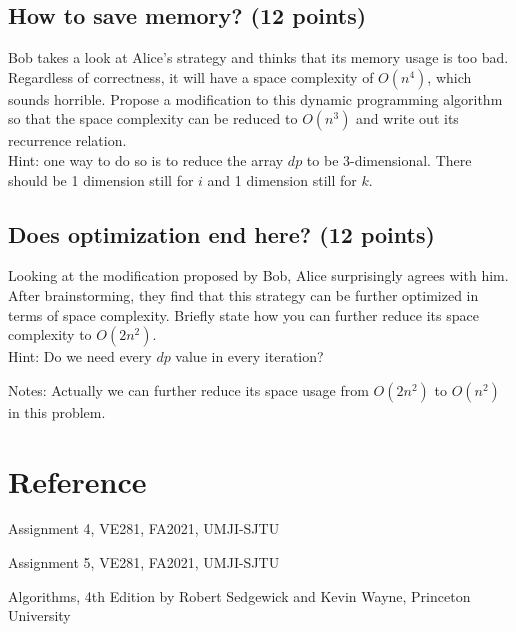 \documentclass[11pt]{exam}
\begin{document}
\subsection{How to save memory? (12 points)}
Bob takes a look at Alice's strategy and thinks that its memory usage is too bad. Regardless of correctness, it will have a space complexity of $O(n^4)$, which sounds horrible. Propose a modification to this dynamic programming algorithm so that the space complexity can be reduced to $O(n^3)$ and write out its recurrence relation.\\
Hint: one way to do so is to reduce the array $dp$ to be 3-dimensional. There should be 1 dimension still for $i$ and 1 dimension still for $k$.
\begin{solution}
\end{solution}
\subsection{Does optimization end here? (12 points)}
Looking at the modification proposed by Bob, Alice surprisingly agrees with him. After brainstorming, they find that this strategy can be further optimized in terms of space complexity. Briefly state how you can further reduce its space complexity to $O(2n^2)$.\\
Hint: Do we need every $dp$ value in every iteration?
\begin{solution}
\end{solution}
Notes: Actually we can further reduce its space usage from $O(2n^2)$ to $O(n^2)$ in this problem.
\newpage

\section*{Reference}
Assignment 4, VE281, FA2021, UMJI-SJTU

Assignment 5, VE281, FA2021, UMJI-SJTU

Algorithms, 4th Edition by Robert Sedgewick and Kevin Wayne, Princeton University
\end{document}
